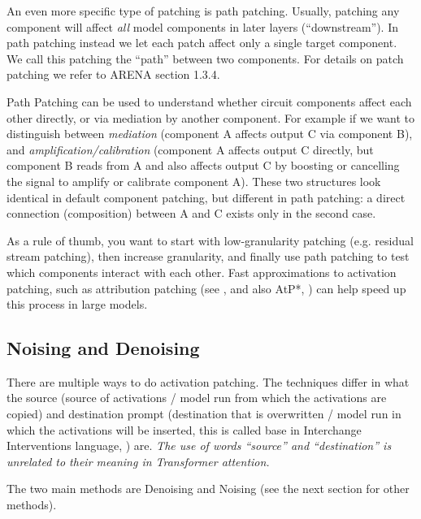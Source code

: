 \documentclass[nonatbib]{article}
\begin{document}
An even more specific type of patching is path patching. Usually, patching any component will affect \textit{all} model components in later layers (“downstream”). In path patching instead we let each patch affect only a single target component. We call this patching the “path” between two components. For details on patch patching we refer to ARENA section 1.3.4.

Path Patching can be used to understand whether circuit components affect each other directly, or via mediation by another component. For example if we want to distinguish between \textit{mediation} (component A affects output C via component B), and \textit{amplification/calibration} (component A affects output C directly, but component B reads from A and also affects output C by boosting or cancelling the signal to amplify or calibrate component A). These two structures look identical in default component patching, but different in path patching: a direct connection (composition) between A and C exists only in the second case.

As a rule of thumb, you want to start with low-granularity patching (e.g. residual stream patching), then increase granularity, and finally use path patching to test which components interact with each other. Fast approximations to activation patching, such as attribution patching (see \cite{attribution_patching}, and also
AtP*, \cite{atpstar}) can help speed up this process in large models.

\subsection{Noising and Denoising}

There are multiple ways to do activation patching. The techniques differ in what the source (source of activations / model run from which the activations are copied) and destination prompt (destination that is overwritten / model run in which the activations will be inserted, this is called base in Interchange Interventions language, \cite{2021arXiv211200826G}) are. \textit{The use of words “source” and “destination” is unrelated to their meaning in Transformer attention.}

The two main methods are Denoising and Noising (see the next section for other methods).
\end{document}
